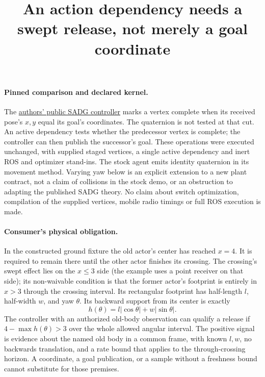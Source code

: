 \documentclass[11pt]{article}
\title{An action dependency needs a swept release, not merely a goal coordinate}
\author{}\date{}
\begin{document}
\maketitle

\paragraph{Pinned comparison and declared kernel.}
The \href{https://github.com/alexberndt/sadg-controller/tree/c2626d996121a9d6c128844a167b917db24418ac}
{authors' public SADG controller} marks a vertex complete when its
received pose's \(x,y\) equal its goal's coordinates. The quaternion is
not tested at that cut. An active dependency tests whether the
predecessor vertex is complete; the controller can then publish the
successor's goal. These operations were executed unchanged, with
supplied staged vertices, a single active dependency and inert ROS and
optimizer stand-ins. The stock agent emits identity quaternion in its
movement method. Varying yaw below is an explicit extension to a new
plant contract, not a claim of collisions in the stock demo, or an
obstruction to adapting the published SADG theory. No claim about
switch optimization, compilation of the supplied vertices, mobile
radio timings or full ROS execution is made.

\paragraph{Consumer's physical obligation.}
In the constructed ground fixture the old actor's center has reached
\(x=4\). It is required to remain there until the other actor finishes
its crossing. The crossing's swept effect lies on the \(x\le3\) side
(the example uses a point receiver on that side); its non-waivable
condition is that the former actor's footprint is entirely in \(x>3\)
through the crossing interval. Its rectangular footprint has
half-length \(l\), half-width \(w\), and yaw \(\theta\). Its backward
support from its center is exactly
\[
               h(\theta)=l|\cos\theta|+w|\sin\theta|.
\]
The controller with an authorized old-body observation can qualify a
release if \(4-\max h(\theta)>3\) over the whole allowed angular interval.
The positive signal is evidence about the named old body in a common
frame, with known \(l,w\), no backwards translation, and a rate bound
that applies to the through-crossing horizon. A coordinate, a goal
publication, or a sample without a freshness bound cannot substitute
for those premises.
\end{document}
